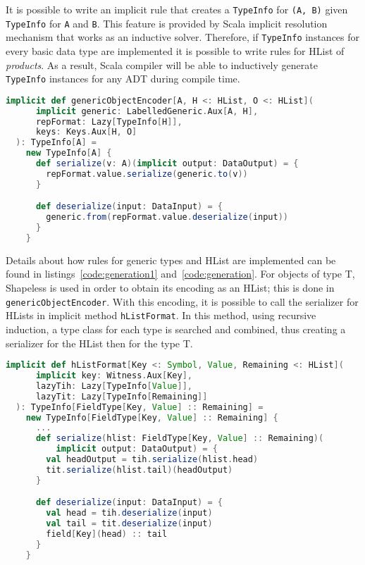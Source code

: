It is possible to write an implicit rule that creates a
\lstinline[columns=fixed]{TypeInfo} for \lstinline[columns=fixed]{(A, B)} given
\lstinline[columns=fixed]{TypeInfo} for \lstinline[columns=fixed]{A} and
\lstinline[columns=fixed]{B}. This feature is provided by Scala implicit
resolution mechanism that works as an inductive solver. Therefore, if
\lstinline[columns=fixed]{TypeInfo} instances for every basic data type are
implemented it is possible to write rules for \acs{HList} of
\textit{products}. As a result, Scala compiler will be able to inductively
generate \lstinline[columns=fixed]{TypeInfo} instances for any \acs{ADT}
during compile time.

\begin{lstlisting}[language=scala, frame=trBL, label=code:generation1, float=ht, caption = {Serializer-Deserializer typeclass using parametric polymorphism}]
  implicit def genericObjectEncoder[A, H <: HList, O <: HList](
      implicit generic: LabelledGeneric.Aux[A, H],
      repFormat: Lazy[TypeInfo[H]],
      keys: Keys.Aux[H, O]
  ): TypeInfo[A] =
    new TypeInfo[A] {
      def serialize(v: A)(implicit output: DataOutput) = {
        repFormat.value.serialize(generic.to(v))
      }

      def deserialize(input: DataInput) = {
        generic.from(repFormat.value.deserialize(input))
      }
    }
\end{lstlisting}

Details about how rules for generic types and \acs{HList} are implemented can be
found in listings~\ref{code:generation1} and~\ref{code:generation}. For
objects of type T, Shapeless is used in order to obtain its encoding as an
\acs{HList}; this is done in \lstinline[columns=fixed]{genericObjectEncoder}.
With this encoding, it is possible to call the serializer for \acs{HList}s in
implicit method \lstinline[columns=fixed]{hListFormat}. In this method, using
recursive induction, a type class for each type is searched and combined, thus
creating a serializer for the \acs{HList} then for the type T.

\begin{lstlisting}[language=scala, frame=trBL, label=code:generation, float=ht, caption = {Serializer-Deserializer typeclass for \acs{HList}}]
  implicit def hListFormat[Key <: Symbol, Value, Remaining <: HList](
      implicit key: Witness.Aux[Key],
      lazyTih: Lazy[TypeInfo[Value]],
      lazyTit: Lazy[TypeInfo[Remaining]]
  ): TypeInfo[FieldType[Key, Value] :: Remaining] =
    new TypeInfo[FieldType[Key, Value] :: Remaining] {
      ...
      def serialize(hlist: FieldType[Key, Value] :: Remaining)(
          implicit output: DataOutput) = {
        val headOutput = tih.serialize(hlist.head)
        tit.serialize(hlist.tail)(headOutput)
      }

      def deserialize(input: DataInput) = {
        val head = tih.deserialize(input)
        val tail = tit.deserialize(input)
        field[Key](head) :: tail
      }
    }
\end{lstlisting}

